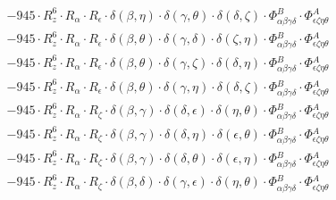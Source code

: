 \documentclass{article}
\begin{document}
\begin{equation}
\begin{array}{c}
 \\[0.2em] 		 - 945 \cdot R_{z}^{6} \cdot R_{\alpha{}} \cdot R_{\epsilon{}} \cdot \delta{}\left(\beta{}, \eta{}\right) \cdot \delta{}\left(\gamma{}, \theta{}\right) \cdot \delta{}\left(\delta{}, \zeta{}\right) \cdot \Phi{}^{B}_{\alpha{}\beta{}\gamma{}\delta{}} \cdot \Phi{}^{A}_{\epsilon{}\zeta{}\eta{}\theta{}} 
 \\[0.2em] 		 - 945 \cdot R_{z}^{6} \cdot R_{\alpha{}} \cdot R_{\epsilon{}} \cdot \delta{}\left(\beta{}, \theta{}\right) \cdot \delta{}\left(\gamma{}, \delta{}\right) \cdot \delta{}\left(\zeta{}, \eta{}\right) \cdot \Phi{}^{B}_{\alpha{}\beta{}\gamma{}\delta{}} \cdot \Phi{}^{A}_{\epsilon{}\zeta{}\eta{}\theta{}} 
 \\[0.2em] 		 - 945 \cdot R_{z}^{6} \cdot R_{\alpha{}} \cdot R_{\epsilon{}} \cdot \delta{}\left(\beta{}, \theta{}\right) \cdot \delta{}\left(\gamma{}, \zeta{}\right) \cdot \delta{}\left(\delta{}, \eta{}\right) \cdot \Phi{}^{B}_{\alpha{}\beta{}\gamma{}\delta{}} \cdot \Phi{}^{A}_{\epsilon{}\zeta{}\eta{}\theta{}} 
 \\[0.2em] 		 - 945 \cdot R_{z}^{6} \cdot R_{\alpha{}} \cdot R_{\epsilon{}} \cdot \delta{}\left(\beta{}, \theta{}\right) \cdot \delta{}\left(\gamma{}, \eta{}\right) \cdot \delta{}\left(\delta{}, \zeta{}\right) \cdot \Phi{}^{B}_{\alpha{}\beta{}\gamma{}\delta{}} \cdot \Phi{}^{A}_{\epsilon{}\zeta{}\eta{}\theta{}} 
 \\[0.2em] 		 - 945 \cdot R_{z}^{6} \cdot R_{\alpha{}} \cdot R_{\zeta{}} \cdot \delta{}\left(\beta{}, \gamma{}\right) \cdot \delta{}\left(\delta{}, \epsilon{}\right) \cdot \delta{}\left(\eta{}, \theta{}\right) \cdot \Phi{}^{B}_{\alpha{}\beta{}\gamma{}\delta{}} \cdot \Phi{}^{A}_{\epsilon{}\zeta{}\eta{}\theta{}} 
 \\[0.2em] 		 - 945 \cdot R_{z}^{6} \cdot R_{\alpha{}} \cdot R_{\zeta{}} \cdot \delta{}\left(\beta{}, \gamma{}\right) \cdot \delta{}\left(\delta{}, \eta{}\right) \cdot \delta{}\left(\epsilon{}, \theta{}\right) \cdot \Phi{}^{B}_{\alpha{}\beta{}\gamma{}\delta{}} \cdot \Phi{}^{A}_{\epsilon{}\zeta{}\eta{}\theta{}} 
 \\[0.2em] 		 - 945 \cdot R_{z}^{6} \cdot R_{\alpha{}} \cdot R_{\zeta{}} \cdot \delta{}\left(\beta{}, \gamma{}\right) \cdot \delta{}\left(\delta{}, \theta{}\right) \cdot \delta{}\left(\epsilon{}, \eta{}\right) \cdot \Phi{}^{B}_{\alpha{}\beta{}\gamma{}\delta{}} \cdot \Phi{}^{A}_{\epsilon{}\zeta{}\eta{}\theta{}} 
 \\[0.2em] 		 - 945 \cdot R_{z}^{6} \cdot R_{\alpha{}} \cdot R_{\zeta{}} \cdot \delta{}\left(\beta{}, \delta{}\right) \cdot \delta{}\left(\gamma{}, \epsilon{}\right) \cdot \delta{}\left(\eta{}, \theta{}\right) \cdot \Phi{}^{B}_{\alpha{}\beta{}\gamma{}\delta{}} \cdot \Phi{}^{A}_{\epsilon{}\zeta{}\eta{}\theta{}} 

\end{array}
\end{equation}
\end{document}
